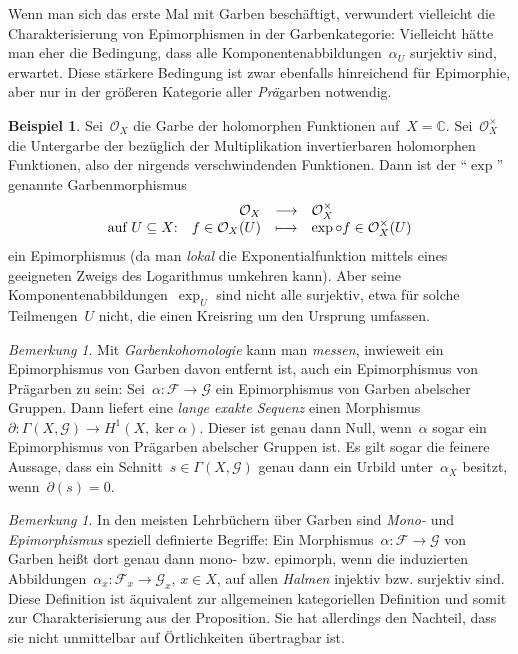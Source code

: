 \documentclass[a4paper,ngerman,12pt]{scrartcl}
\theoremstyle{definition}
\newtheorem{bsp}[defn]{Beispiel}
\theoremstyle{plain}
\theoremstyle{remark}
\newtheorem{bem}[defn]{Bemerkung}
\newcommand{\CC}{\mathbb{C}}
\newcommand{\F}{\mathcal{F}}
\newcommand{\G}{\mathcal{G}}
\renewcommand{\O}{\mathcal{O}}
\renewcommand{\_}{\mathpunct{.}\,}
\newcommand{\?}{\,{:}\,}
\begin{document}
Wenn man sich das erste Mal mit Garben beschäftigt, verwundert vielleicht die
Charakterisierung von Epimorphismen in der Garbenkategorie: Vielleicht hätte man eher die
Bedingung, dass alle Komponentenabbildungen~$\alpha_U$ surjektiv sind,
erwartet. Diese stärkere Bedingung ist zwar ebenfalls hinreichend für Epimorphie,
aber nur in der größeren Kategorie aller \emph{Prä}garben notwendig.

\begin{bsp}Sei~$\O_X$ die Garbe der holomorphen Funktionen auf~$X = \CC$.
Sei~$\O_X^\times$ die Untergarbe der bezüglich der Multiplikation
invertierbaren holomorphen Funktionen, also der nirgends verschwindenden
Funktionen. Dann ist der "`$\exp$"' genannte Garbenmorphismus
\[ \begin{array}{@{}rrcl@{}}
           & \O_X &\longrightarrow& \O_X^\times \\
  \text{auf $U \subseteq X$:} & f \in \O_X(U) &\longmapsto& \exp \circ f \in
  \O_X^\times(U)
\end{array} \]
ein Epimorphismus (da man \emph{lokal} die Exponentialfunktion mittels eines
geeigneten Zweigs des Logarithmus umkehren kann). Aber seine
Komponentenabbildungen~$\exp_U$ sind nicht alle surjektiv, etwa für solche
Teilmengen~$U$ nicht, die einen Kreisring um den Ursprung umfassen.\end{bsp}

\begin{bem}Mit \emph{Garbenkohomologie} kann man \emph{messen}, inwieweit ein
Epimorphismus von Garben davon entfernt ist, auch ein Epimorphismus von
Prägarben zu sein: Sei~$\alpha : \F \to \G$ ein Epimorphismus von Garben
abelscher Gruppen. Dann liefert eine \emph{lange exakte Sequenz} einen
Morphismus~$\partial : \Gamma(X,\G) \to H^1(X,\ker\alpha)$. Dieser ist genau dann Null,
wenn~$\alpha$ sogar ein Epimorphismus von Prägarben abelscher Gruppen ist.
Es gilt sogar die feinere Aussage, dass ein Schnitt~$s \in \Gamma(X,\G)$ genau
dann ein Urbild unter~$\alpha_X$ besitzt, wenn~$\partial(s) = 0$.
\end{bem}

\begin{bem}In den meisten Lehrbüchern über Garben sind \emph{Mono-} und \emph{Epimorphismus} speziell
definierte Begriffe: Ein Morphismus~$\alpha : \F \to \G$ von Garben heißt dort genau dann
mono- bzw. epimorph, wenn die induzierten Abbildungen~$\alpha_x : \F_x \to
\G_x$, $x \in X$, auf allen \emph{Halmen} injektiv bzw. surjektiv sind. Diese
Definition ist äquivalent zur allgemeinen kategoriellen Definition und somit
zur Charakterisierung aus der Proposition. Sie hat allerdings den Nachteil, dass sie nicht
unmittelbar auf Örtlichkeiten übertragbar ist.\end{bem}


\nocite{*}
\printbibliography
\end{document}
